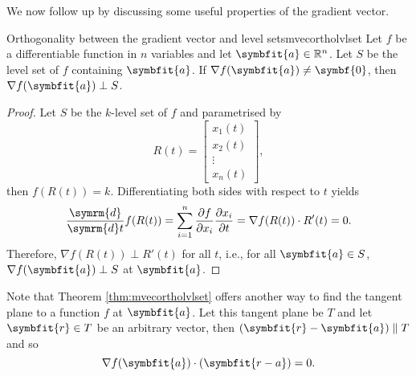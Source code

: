 \documentclass[math]{amznotes}
\theoremstyle{remark}
\begin{document}
We now follow up by discussing some useful properties of the gradient vector.
\begin{thmbox}{Orthogonality between the gradient vector and level sets}{mvecortholvlset}
    Let $f$ be a differentiable function in $n$ variables and let $\symbfit{a} \in \R^n$. Let $S$ be the level set of $f$ containing $\symbfit{a}$. If $\nabla f(\symbfit{a}) \neq \symbf{0}$, then $\nabla f(\symbfit{a}) \perp S$.
    \tcblower
    \begin{proof}
        Let $S$ be the $k$-level set of $f$ and parametrised by
        \begin{displaymath}
            R(t) = \left[\begin{array}{c}
                    x_1(t) \\
                    x_2(t) \\
                    \vdots \\
                    x_n(t)
                \end{array}\right],
        \end{displaymath}
        then $f(R(t)) = k$. Differentiating both sides with respect to $t$ yields
        \begin{equation*}
            \frac{\symrm{d}}{\symrm{d}t}f(R(t)) = \sum_{i = 1}^n \frac{\partial f}{\partial x_i}\frac{\partial x_i}{\partial t} = \nabla f(R(t)) \cdot R'(t) = 0.
        \end{equation*}
        Therefore, $\nabla f(R(t)) \perp R'(t)$ for all $t$, i.e., for all $\symbfit{a} \in S$, $\nabla f(\symbfit{a}) \perp S$ at $\symbfit{a}$.
    \end{proof}
\end{thmbox}
Note that Theorem \ref{thm:mvecortholvlset} offers another way to find the tangent plane to a function $f$ at $\symbfit{a}$. Let this tangent plane be $T$ and let $\symbfit{r} \in T$ be an arbitrary vector, then $(\symbfit{r} - \symbfit{a}) \parallel T$ and so
\begin{equation*}
    \nabla f(\symbfit{a}) \cdot (\symbfit{r - a}) = 0.
\end{equation*}
\end{document}
